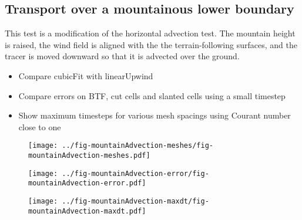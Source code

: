 \subsection{Transport over a mountainous lower boundary}
This test is a modification of the \citet{schaer2002} horizontal advection test.  The mountain height is raised, the wind field is aligned with the the terrain-following surfaces, and the tracer is moved downward so that it is advected over the ground.

\begin{itemize}
	\item Compare cubicFit with linearUpwind
	\item Compare errors on BTF, cut cells and slanted cells using a small timestep
	\item Show maximum timesteps for various mesh spacings using Courant number close to one
\end{itemize}

\begin{figure}
	\centering
	\texttt{[image: ../fig-mountainAdvection-meshes/fig-mountainAdvection-meshes.pdf]}
	\caption{}
\end{figure}

\begin{figure}
	\centering
	\texttt{[image: ../fig-mountainAdvection-error/fig-mountainAdvection-error.pdf]}
	\caption{}
\end{figure}

\begin{figure}
	\centering
	\texttt{[image: ../fig-mountainAdvection-maxdt/fig-mountainAdvection-maxdt.pdf]}
	\caption{}
\end{figure}

